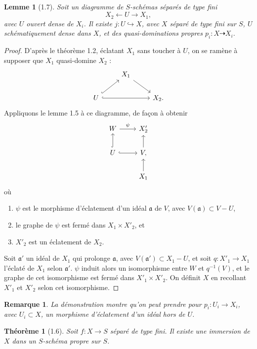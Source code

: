 \documentclass[11pt]{article}
\newtheorem*{theorem}{Théorème}
\newtheorem*{lemma}{Lemme}
\newtheorem*{remark}{Remarque}
\begin{document}
\begin{lemma}[1.7]
Soit un diagramme de \(S\)-schémas séparés de type fini
\[
X_2 \xleftarrow{\ } U \xrightarrow{\ } X_1,
\]
avec \(U\) ouvert dense de \(X_i\). Il existe \(j:U\hookrightarrow X\), avec \(X\) séparé de type fini sur \(S\), \(U\) schématiquement dense dans \(X\), et des quasi-dominations propres \(p_i:X\dashrightarrow X_i\).
\end{lemma}

\begin{proof}
D'après le théorème 1.2, éclatant \(X_1\) sans toucher à \(U\), on se ramène à supposer que \(X_1\) quasi-domine \(X_2\) :
\[
\begin{tikzcd}
& X_1 \ar[dr] & \\
U \ar[ur,hook] \ar[rr,hook] && X_2.
\end{tikzcd}
\]
Appliquons le lemme 1.5 à ce diagramme, de façon à obtenir
\[
\begin{tikzcd}
W \ar[r,"\psi"] & X'_2 \\
U \ar[u,hook] \ar[r,hook] & V \ar[u], \\
& X_1 \ar[u]
\end{tikzcd}
\]
où
\begin{enumerate}[label=(\alph*)]
\item \(\psi\) est le morphisme d'éclatement d'un idéal \(\mathfrak a\) de \(V\), avec \(V(\mathfrak a)\subset V-U\),
\item le graphe de \(\psi\) est fermé dans \(X_1\times X'_2\), et
\item \(X'_2\) est un éclatement de \(X_2\).
\end{enumerate}
Soit \(\mathfrak a'\) un idéal de \(X_1\) qui prolonge \(\mathfrak a\), avec \(V(\mathfrak a')\subset X_1-U\), et soit \(q:X'_1\to X_1\) l'éclaté de \(X_1\) selon \(\mathfrak a'\). \(\psi\) induit alors un isomorphisme entre \(W\) et \(q^{-1}(V)\), et le graphe de cet isomorphisme est fermé dans \(X'_1\times X'_2\). On définit \(X\) en recollant \(X'_1\) et \(X'_2\) selon cet isomorphisme.
\end{proof}

\begin{remark}
La démonstration montre qu'on peut prendre pour \(p_i:U_i\to X_i\), avec \(U_i\subset X\), un morphisme d'éclatement d'un idéal hors de \(U\).
\end{remark}

\begin{theorem}[1.6]
Soit \(f:X\to S\) séparé de type fini. Il existe une immersion de \(X\) dans un \(S\)-schéma propre sur \(S\).
\end{theorem}
\end{document}
